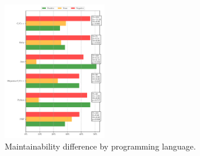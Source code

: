 \documentclass[10pt,conference]{IEEEtran}
\begin{document}
\begin{figure}[htp]
\vspace{-0.4cm}
  \centering
  \includegraphics[width=0.4\textwidth]{figures/main_per_language.pdf}
  \vspace{-0.3cm}
  \caption{Maintainability difference by programming language.}
  \label{fig:lang_main}  
  \vspace{-0.2cm}
  
\end{figure}
\end{document}
